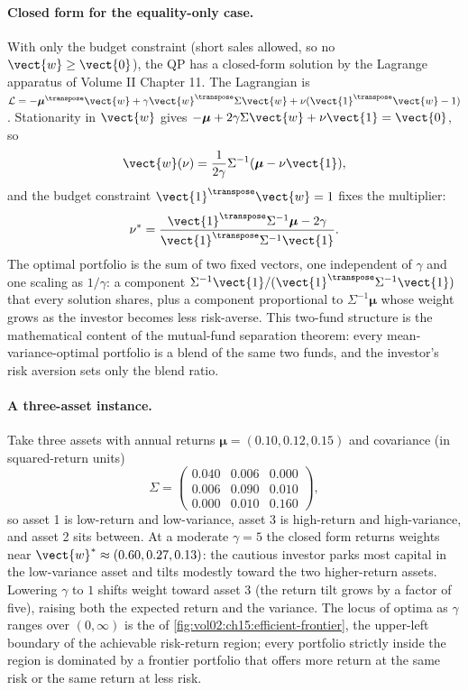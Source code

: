 \paragraph{Closed form for the equality-only case.}
With only the budget constraint (short sales allowed, so no
$\vect{w} \geq \vect{0}$), the QP has a closed-form solution by the
Lagrange apparatus of Volume II Chapter 11. The Lagrangian is
$\mathcal{L} = -\boldsymbol{\mu}^{\transpose} \vect{w} + \gamma
\vect{w}^{\transpose} \Sigma \vect{w} + \nu (\vect{1}^{\transpose}
\vect{w} - 1)$. Stationarity in $\vect{w}$ gives $-\boldsymbol{\mu}
+ 2 \gamma \Sigma \vect{w} + \nu \vect{1} = \vect{0}$, so
\[
\vect{w}(\nu) = \frac{1}{2 \gamma} \Sigma^{-1}
(\boldsymbol{\mu} - \nu \vect{1}),
\]
and the budget constraint $\vect{1}^{\transpose} \vect{w} = 1$
fixes the multiplier:
\[
\nu^{*} = \frac{\vect{1}^{\transpose} \Sigma^{-1} \boldsymbol{\mu}
- 2 \gamma}{\vect{1}^{\transpose} \Sigma^{-1} \vect{1}}.
\]
The optimal portfolio is the sum of two fixed vectors, one
independent of $\gamma$ and one scaling as $1/\gamma$: a
 component $\Sigma^{-1} \vect{1} /
(\vect{1}^{\transpose} \Sigma^{-1} \vect{1})$ that every solution
shares, plus a  component proportional to
$\Sigma^{-1} \boldsymbol{\mu}$ whose weight grows as the investor
becomes less risk-averse. This two-fund structure is the
mathematical content of the mutual-fund separation theorem: every
mean-variance-optimal portfolio is a blend of the same two funds,
and the investor's risk aversion sets only the blend ratio.

\paragraph{A three-asset instance.}
Take three assets with annual returns $\boldsymbol{\mu} = (0.10,
0.12, 0.15)$ and covariance (in squared-return units)
\[
\Sigma = \begin{pmatrix}
0.040 & 0.006 & 0.000 \\
0.006 & 0.090 & 0.010 \\
0.000 & 0.010 & 0.160
\end{pmatrix},
\]
so asset 1 is low-return and low-variance, asset 3 is high-return
and high-variance, and asset 2 sits between. At a moderate
$\gamma = 5$ the closed form returns weights near $\vect{w}^{*}
\approx (0.60, 0.27, 0.13)$: the cautious investor parks most
capital in the low-variance asset and tilts modestly toward the
two higher-return assets. Lowering $\gamma$ to $1$ shifts weight
toward asset 3 (the return tilt grows by a factor of five),
raising both the expected return and the variance. The locus of
optima as $\gamma$ ranges over $(0, \infty)$ is the
 of \cref{fig:vol02:ch15:efficient-frontier},
the upper-left boundary of the achievable risk-return region; every
portfolio strictly inside the region is dominated by a frontier
portfolio that offers more return at the same risk or the same
return at less risk.

